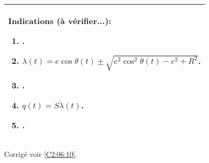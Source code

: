 \ifprof
\else
\footnotesize
\begin{center}
\begin{tabular}{|p{.9\linewidth}|}
\hline
Indications (à vérifier...):
\begin{enumerate}
\item .
\item $ \lambda(t)= e\cos\theta(t)\pm \sqrt{e^2\cos^2\theta(t)-e^2+R^2}$.
\item .
\item $q(t)=S\dot{\lambda}(t)$.
\item .
\end{enumerate} \\ \hline
\end{tabular}
\end{center}
\normalsize
\begin{flushright}
\footnotesize{Corrigé  voir \ref{C2:06:10}.}
\end{flushright}%
\fi